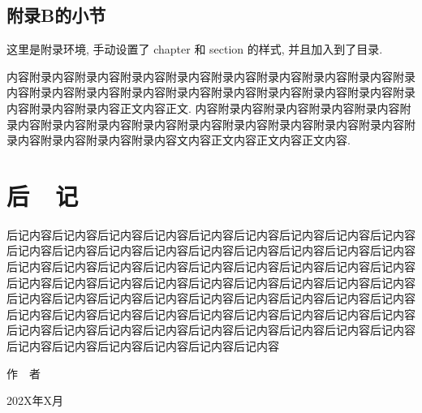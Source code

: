\documentclass[openany,twoside,12pt]{book}
\theoremstyle{plain}
\begin{document}
\section{附录B的小节}

这里是附录环境, 手动设置了 chapter 和 section 的样式, 并且加入到了目录.

内容附录内容附录内容附录内容附录内容附录内容附录内容附录内容附录内容附录内容附录内容附录内容附录内容附录内容附录内容附录内容附录内容附录内容附录内容附录内容附录内容正文内容正文. 内容附录内容附录内容附录内容附录内容附录内容附录内容附录内容附录内容附录内容附录内容附录内容附录内容附录内容附录内容附录内容附录内容附录内容文内容正文内容正文内容正文内容.




\backmatter  %



\clearpage
\renewcommand\indexname{索~~引}
{}
\printindex




\chapter{后~~记}

后记内容后记内容后记内容后记内容后记内容后记内容后记内容后记内容后记内容后记内容后记内容后记内容后记内容后记内容后记内容后记内容后记内容后记内容后记内容后记内容后记内容后记内容后记内容后记内容后记内容后记内容后记内容后记内容后记内容后记内容后记内容后记内容后记内容后记内容后记内容后记内容后记内容后记内容后记内容后记内容后记内容后记内容后记内容后记内容后记内容后记内容后记内容后记内容后记内容后记内容后记内容后记内容后记内容后记内容后记内容后记内容后记内容后记内容后记内容后记内容后记内容后记内容后记内容后记内容后记内容后记内容后记内容后记内容后记内容


\vspace{5ex}
\begin{flushright}
作~~者~~~~~~~~~

202X年X月~~~~~
\end{flushright}
\end{document}
